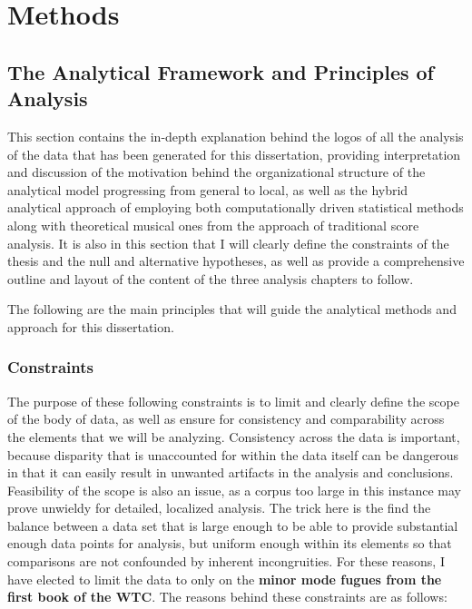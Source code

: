     
    
    

    \hypertarget{Methods}{\chapter{Methods}\label{Methods}}
    \section{The Analytical Framework and Principles of
Analysis}\label{the-analytical-framework-and-principles-of-analysis}

    This section contains the in-depth explanation behind the logos of all
the analysis of the data that has been generated for this dissertation,
providing interpretation and discussion of the motivation behind the
organizational structure of the analytical model progressing from
general to local, as well as the hybrid analytical approach of employing
both computationally driven statistical methods along with theoretical
musical ones from the approach of traditional score analysis. It is also
in this section that I will clearly define the constraints of the thesis
and the null and alternative hypotheses, as well as provide a
comprehensive outline and layout of the content of the three analysis
chapters to follow.

The following are the main principles that will guide the analytical
methods and approach for this dissertation.

    \subsection{Constraints}\label{constraints}

The purpose of these following constraints is to limit and clearly
define the scope of the body of data, as well as ensure for consistency
and comparability across the elements that we will be analyzing.
Consistency across the data is important, because disparity that is
unaccounted for within the data itself can be dangerous in that it can
easily result in unwanted artifacts in the analysis and conclusions.
Feasibility of the scope is also an issue, as a corpus too large in this
instance may prove unwieldy for detailed, localized analysis. The trick
here is the find the balance between a data set that is large enough to
be able to provide substantial enough data points for analysis, but
uniform enough within its elements so that comparisons are not
confounded by inherent incongruities. For these reasons, I have elected
to limit the data to only on the \textbf{minor mode fugues from the
first book of the WTC}. The reasons behind these constraints are as
follows:

